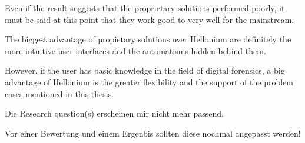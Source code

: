 Even if the result suggests that the proprietary solutions performed poorly, it must be said at this point that they work good to very well for the mainstream.

The biggest advantage of propietary solutions over Hellonium are definitely the more intuitive user interfaces and the automatisms hidden behind them.

However, if the user has basic knowledge in the field of digital forensics, a big advantage of Hellonium is the greater flexibility and the support of the problem cases mentioned in this thesis.



Die Research question(s) erscheinen mir nicht mehr passend.

Vor einer Bewertung und einem Ergenbis sollten diese nochmal angepasst werden!
